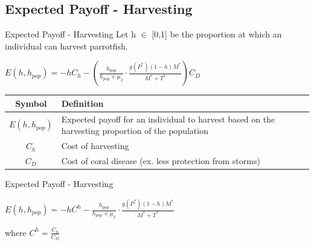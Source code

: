 \documentclass{beamer}
\begin{document}
\subsection{Expected Payoff - Harvesting}
\begin{frame}{Expected Payoff - Harvesting}
    Let h $\in$ [0,1] be the proportion at which an individual can harvest parrotfish.
    \begin{center}
    $\displaystyle {E(h, h_{pop}) = -hC_{h} - \left( \frac{h_{pop}}{h_{pop} + \mu_{2}} \cdot \frac{g(P^{*})(1-h)M^{*}}{M^{*} + T^{*}} \right) C_{D}}$ \\
    
    \vspace{0.6cm}
    
    \begin{table}[H]
        \centering
        \begin{tabular}{c|p{8cm}}
             Symbol & Definition \\
             \hline
             $E(h, h_{pop})$ & Expected payoff for an individual to harvest based on the harvesting proportion of the population \\
             $C_{h}$ & Cost of harvesting \\
             $C_{D}$ & Cost of coral disease (ex. less protection from storms)\\
        \end{tabular}
        \label{tab:my_label}
    \end{table}
    \end{center}
\end{frame}

\begin{frame}{Expected Payoff - Harvesting}
    \begin{center}
    $\displaystyle {E(h, h_{pop}) = -hC^{h} - \frac{h_{pop}}{h_{pop} + \mu_{2}} \cdot \frac{g(P^{*})(1-h)M^{*}}{M^{*} + T^{*}}}$ \\
    
    \vspace{0.6cm}
    
    where $C^{h} = \frac{C_{h}}{C_{D}}$
    \end{center}
\end{frame}
\end{document}
